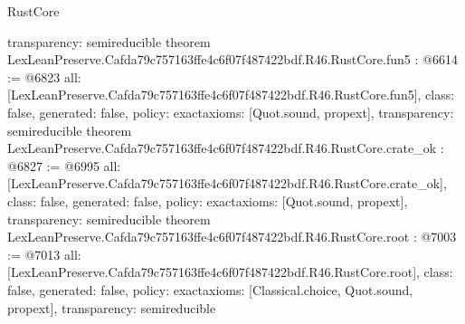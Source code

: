 \begin{lexlean}{RustCore}
\begin{coremodule}
{  transparency: semireducible
}
theorem LexLeanPreserve.Cafda79c757163ffe4c6f07f487422bdf.R46.RustCore.fun5 : @6614 := @6823 {
  all: [LexLeanPreserve.Cafda79c757163ffe4c6f07f487422bdf.R46.RustCore.fun5],
  class: false,
  generated: false,
  policy: exact{axioms: [Quot.sound, propext]},
  transparency: semireducible
}
theorem LexLeanPreserve.Cafda79c757163ffe4c6f07f487422bdf.R46.RustCore.crate_ok : @6827 := @6995 {
  all: [LexLeanPreserve.Cafda79c757163ffe4c6f07f487422bdf.R46.RustCore.crate_ok],
  class: false,
  generated: false,
  policy: exact{axioms: [Quot.sound, propext]},
  transparency: semireducible
}
theorem LexLeanPreserve.Cafda79c757163ffe4c6f07f487422bdf.R46.RustCore.root : @7003 := @7013 {
  all: [LexLeanPreserve.Cafda79c757163ffe4c6f07f487422bdf.R46.RustCore.root],
  class: false,
  generated: false,
  policy: exact{axioms: [Classical.choice, Quot.sound, propext]},
  transparency: semireducible
}


\end{coremodule}
\end{lexlean}
